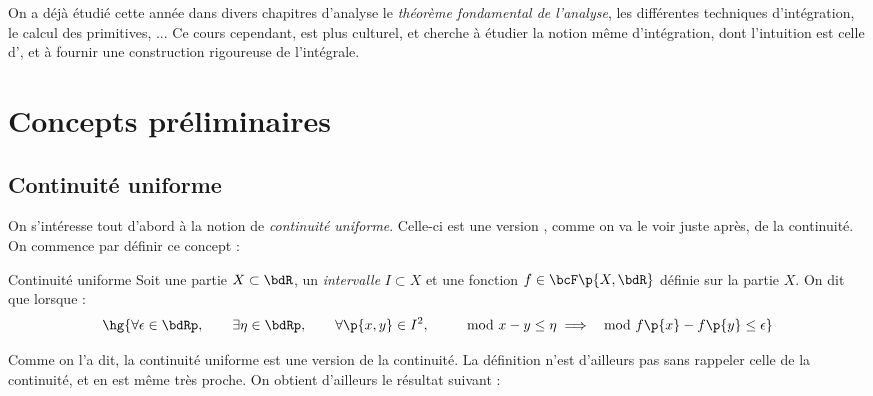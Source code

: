 \documentclass[a4paper,french,bookmarks]{article}
\begin{document}
    
    On a déjà étudié cette année dans divers chapitres d'analyse le \textit{théorème fondamental de l'analyse}, les différentes techniques d'intégration, le calcul des primitives, ... Ce cours cependant, est plus culturel, et cherche à étudier la notion même d'intégration, dont l'intuition est celle d', et à fournir une construction rigoureuse de l'intégrale. 

    \initcours{}

    \section{Concepts préliminaires}
    
    \subsection{Continuité uniforme}
    
    On s'intéresse tout d'abord à la notion de \textit{continuité uniforme}. Celle-ci est une version , comme on va le voir juste après, de la continuité. On commence par définir ce concept :
    
    \begin{definition}{Continuité uniforme}{}
        Soit une partie $X \subset \bdR$, un \textit{intervalle} $I \subset X$ et une fonction $f \in \bcF\p{X, \bdR}$ définie sur la partie $X$. On dit que  lorsque :
        \[ \hg{\forall \epsilon \in \bdRp,\qquad \exists \eta \in \bdRp,\qquad \forall \p{x, y} \in I^2,\qquad \mod{x-y} \leq \eta \implies \mod{f\p{x}-f\p{y}} \leq \epsilon}\]
    \end{definition}
    
    Comme on l'a dit, la continuité uniforme est une version  de la continuité. La définition n'est d'ailleurs pas sans rappeler celle de la continuité, et en est même très proche. On obtient d'ailleurs le résultat suivant :
    
\end{document}
